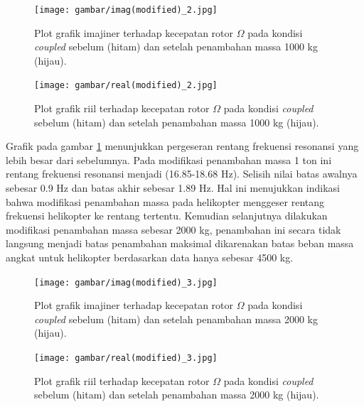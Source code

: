 \begin{figure}[H]
	\centering
	\texttt{[image: gambar/imag(modified)\_2.jpg]}
	\caption{Plot grafik imajiner terhadap kecepatan rotor $\Omega$ pada kondisi \textit{coupled} sebelum (hitam) dan setelah penambahan massa 1000 kg (hijau).}
	\label{fig:imag(modified)_2}
\end{figure}

\begin{figure}[H]
	\centering
	\texttt{[image: gambar/real(modified)\_2.jpg]}
	\caption{Plot grafik riil terhadap kecepatan rotor $\Omega$ pada kondisi \textit{coupled} sebelum (hitam) dan setelah penambahan massa 1000 kg (hijau).}
	\label{fig:real(modified)_2}
\end{figure}

Grafik pada gambar \ref{fig:imag(modified)_2} menunjukkan pergeseran rentang frekuensi resonansi yang lebih besar dari sebelumnya. Pada modifikasi penambahan massa 1 ton ini rentang frekuensi resonansi menjadi (16.85-18.68 Hz). Selisih nilai batas awalnya sebesar 0.9 Hz dan batas akhir sebesar 1.89 Hz. Hal ini menujukkan indikasi bahwa modifikasi penambahan massa pada helikopter menggeser rentang frekuensi helikopter ke rentang tertentu. Kemudian selanjutnya dilakukan modifikasi penambahan massa sebesar 2000 kg, penambahan ini secara tidak langsung menjadi batas penambahan maksimal dikarenakan batas beban massa angkat untuk helikopter berdasarkan data \cite{AS565MBe} hanya sebesar 4500 kg.

\begin{figure}[H]
	\centering
	\texttt{[image: gambar/imag(modified)\_3.jpg]}
	\caption{Plot grafik imajiner terhadap kecepatan rotor $\Omega$ pada kondisi \textit{coupled} sebelum (hitam) dan setelah penambahan massa 2000 kg (hijau).}
	\label{fig:imag(modified)_3}
\end{figure}

\begin{figure}[H]
	\centering
	\texttt{[image: gambar/real(modified)\_3.jpg]}
	\caption{Plot grafik riil terhadap kecepatan rotor $\Omega$ pada kondisi \textit{coupled} sebelum (hitam) dan setelah penambahan massa 2000 kg (hijau).}
	\label{fig:real(modified)_3}
\end{figure}

